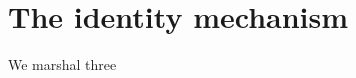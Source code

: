\documentclass[11pt]{article}
\begin{document}
\section{The identity mechanism}\label{secmech}

We marshal three




%
%
%
%
\end{document}
